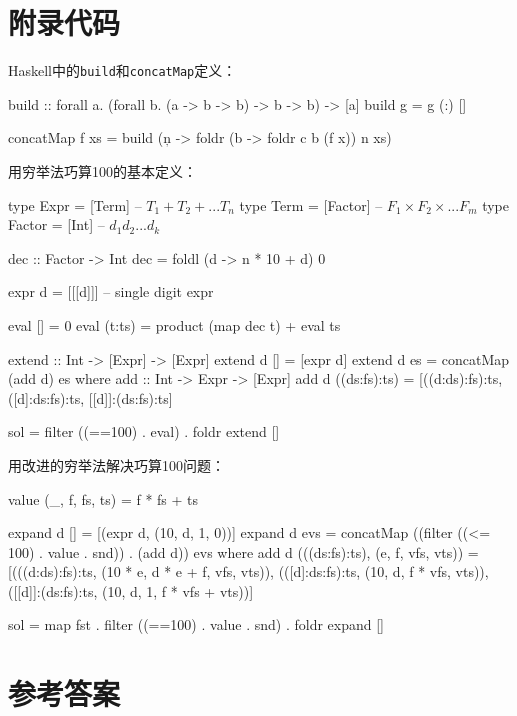 \documentclass[b5paper]{ctexart}
\begin{document}
\section{附录代码}

Haskell中的\texttt{build}和\texttt{concatMap}定义：

\begin{Haskell}
build :: forall a. (forall b. (a -> b -> b) -> b -> b) -> [a]
build g = g (:) []

concatMap f xs = build (\c n -> foldr (\x b -> foldr c b (f x)) n xs)
\end{Haskell}

用穷举法巧算100的基本定义：
\begin{Haskell}[mathescape = true]
type Expr = [Term]     -- $T_1 + T_2 + ... T_n$
type Term = [Factor]   -- $F_1 \times F_2 \times ... F_m$
type Factor = [Int]    -- $d_1 d_2 ...d_k$

dec :: Factor -> Int
dec = foldl (\n d -> n * 10 + d) 0

expr d = [[[d]]]  -- single digit expr

eval [] = 0
eval (t:ts) = product (map dec t) + eval ts

extend :: Int -> [Expr] -> [Expr]
extend d [] = [expr d]
extend d es = concatMap (add d) es where
  add :: Int -> Expr -> [Expr]
  add d ((ds:fs):ts) = [((d:ds):fs):ts,
                        ([d]:ds:fs):ts,
                        [[d]]:(ds:fs):ts]

sol = filter ((==100) . eval) . foldr extend []
\end{Haskell}

用改进的穷举法解决巧算100问题：
\begin{Haskell}
value (_, f, fs, ts) = f * fs + ts

expand d [] = [(expr d, (10, d, 1, 0))]
expand d evs = concatMap ((filter ((<= 100) . value . snd)) . (add d)) evs where
  add d (((ds:fs):ts), (e, f, vfs, vts)) =
    [(((d:ds):fs):ts, (10 * e, d * e + f, vfs, vts)),
     (([d]:ds:fs):ts, (10, d, f * vfs, vts)),
     ([[d]]:(ds:fs):ts, (10, d, 1, f * vfs + vts))]

sol = map fst . filter ((==100) . value . snd) . foldr expand []
\end{Haskell}

\ifx\wholebook\relax \else
\section{参考答案}
\shipoutAnswer
\end{document}
